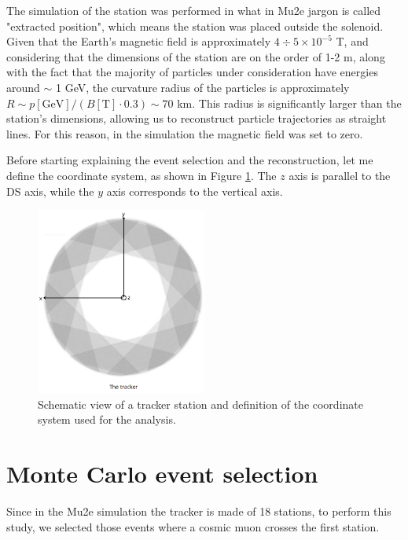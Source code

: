 The simulation of the station was performed in what in Mu2e jargon is called
"extracted position", which means the station was placed outside the solenoid.
Given that the Earth's magnetic field is approximately 
$4 \div 5 \times 10^{-5}$ T, 
and considering that the dimensions of the station are 
on the order of 1-2 m, 
along with the fact that the majority of particles under consideration
have energies around $\sim$ 1 GeV, 
the curvature radius of the particles is approximately 
$R\sim p[\text{GeV}]/(B[\text{T}]\cdot 0.3) \sim 70$ km. 
This radius is significantly larger than the station's 
dimensions, allowing us to reconstruct particle trajectories 
as straight lines.
For this reason, in the simulation  
the magnetic field was set to zero. 

Before starting explaining the event selection and the 
reconstruction, let me define the coordinate system, 
as shown in Figure \ref{fig:coordinate}. The $z$ axis is parallel to 
the DS axis, while the $y$ axis corresponds to the vertical axis.
\begin{figure}[!h]
    \centering
    \includegraphics[width =0.5\textwidth]{figures/png/Screenshot_20240526_164527.png}
    \caption[Schematic view of a tracker station and the coordinate system.]{Schematic view of a tracker station and definition of the coordinate system used for the analysis.}
    \label{fig:coordinate}
\end{figure}
\section{Monte Carlo event selection}\label{eventselection}

Since in the Mu2e simulation the tracker is made of 18 stations, to 
perform this study, we selected those events where a cosmic muon crosses the first station.

